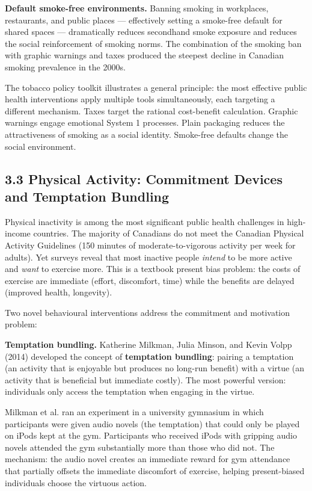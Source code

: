 \documentclass[12pt, letterpaper]{article}
\begin{document}
\textbf{Default smoke-free environments.} Banning smoking in workplaces, restaurants, and public places --- effectively setting a smoke-free default for shared spaces --- dramatically reduces secondhand smoke exposure and reduces the social reinforcement of smoking norms. The combination of the smoking ban with graphic warnings and taxes produced the steepest decline in Canadian smoking prevalence in the 2000s.

The tobacco policy toolkit illustrates a general principle: the most effective public health interventions apply multiple tools simultaneously, each targeting a different mechanism. Taxes target the rational cost-benefit calculation. Graphic warnings engage emotional System 1 processes. Plain packaging reduces the attractiveness of smoking as a social identity. Smoke-free defaults change the social environment.


\subsection{3.3 Physical Activity: Commitment Devices and Temptation Bundling}


Physical inactivity is among the most significant public health challenges in high-income countries. The majority of Canadians do not meet the Canadian Physical Activity Guidelines (150 minutes of moderate-to-vigorous activity per week for adults). Yet surveys reveal that most inactive people \textit{intend} to be more active and \textit{want} to exercise more. This is a textbook present bias problem: the costs of exercise are immediate (effort, discomfort, time) while the benefits are delayed (improved health, longevity).

Two novel behavioural interventions address the commitment and motivation problem:

\textbf{Temptation bundling.} Katherine Milkman, Julia Minson, and Kevin Volpp (2014) developed the concept of \textbf{temptation bundling}: pairing a temptation (an activity that is enjoyable but produces no long-run benefit) with a virtue (an activity that is beneficial but immediate costly). The most powerful version: individuals only access the temptation when engaging in the virtue.

Milkman et al. ran an experiment in a university gymnasium in which participants were given audio novels (the temptation) that could only be played on iPods kept at the gym. Participants who received iPods with gripping audio novels attended the gym substantially more than those who did not. The mechanism: the audio novel creates an immediate reward for gym attendance that partially offsets the immediate discomfort of exercise, helping present-biased individuals choose the virtuous action.
\end{document}
